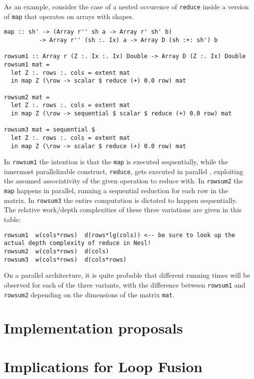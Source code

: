 As an example, consider the case of a nested occurence of \texttt{reduce}
inside a version of \texttt{map} that operates on arrays with shapes.


\begin{verbatim}
map :: sh' -> (Array r'' sh a -> Array r' sh' b)
          -> Array r'' (sh :. Ix) a -> Array D (sh :+: sh') b

rowsum1 :: Array r (Z :. Ix :. Ix) Double -> Array D (Z :. Ix) Double
rowsum1 mat =
  let Z :. rows :. cols = extent mat
  in map Z (\row -> scalar $ reduce (+) 0.0 row) mat

rowsum2 mat =
  let Z :. rows :. cols = extent mat
  in map Z (\row -> sequential $ scalar $ reduce (+) 0.0 row) mat

rowsum3 mat = sequential $
  let Z :. rows :. cols = extent mat
  in map Z (\row -> scalar $ reduce (+) 0.0 row) mat
\end{verbatim}

In \texttt{rowsum1} the intention is that the \texttt{map} is executed
sequentially, while the innermost parallelizable construct, \texttt{reduce},
gets executed in parallel , exploiting the assumed associativity of the
given operation to reduce with.  In \texttt{rowsum2} the \texttt{map} happens
in parallel, running a sequential reduction for each row in the matrix. In
\texttt{rowsum3} the entire computation is dictated to happen sequentially.
The relative work/depth complexities of these three variations are given in
this table:

\begin{verbatim}
rowsum1  w(cols*rows)  d(rows*lg(cols)) <-- be sure to look up the actual depth complexity of reduce in Nesl!
rowsum2  w(cols*rows)  d(cols)
rowsum3  w(cols*rows)  d(cols*rows)
\end{verbatim}

On a parallel architecture, it is quite probable that different running times
will be observed for each of the three variants, with the difference between
\texttt{rowsum1} and \texttt{rowsum2} depending on the dimensions of the matrix
\texttt{mat}.

\section{Implementation proposals}


\section{Implications for Loop Fusion}
